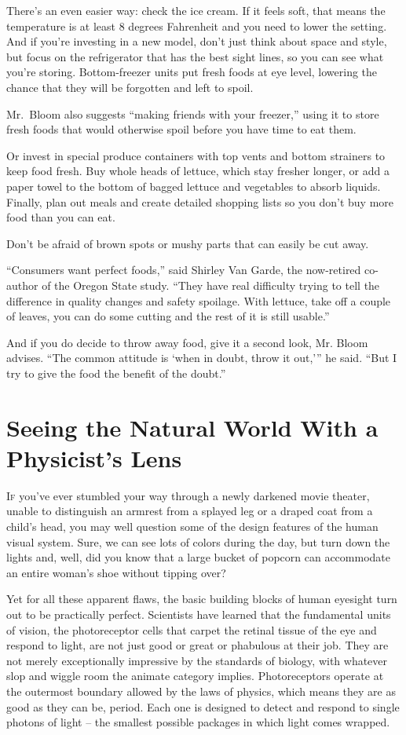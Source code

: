 ﻿\documentclass[12pt]{article}
\begin{document}
There's an even easier way: check the ice cream. If it feels soft, that means the temperature is at
least 8 degrees Fahrenheit and you need to lower the setting. And if you're investing in a new
model, don't just think about space and style, but focus on the refrigerator that has the best sight
lines, so you can see what you're storing. Bottom-freezer units put fresh foods at eye level,
lowering the chance that they will be forgotten and left to spoil.

Mr.~Bloom also suggests ``making friends with your freezer,'' using it to store fresh foods that
would otherwise spoil before you have time to eat them.

Or invest in special produce containers with top vents and bottom strainers to keep food fresh. Buy
whole heads of lettuce, which stay fresher longer, or add a paper towel to the bottom of bagged
lettuce and vegetables to absorb liquids. Finally, plan out meals and create detailed shopping lists
so you don't buy more food than you can eat.

Don't be afraid of brown spots or mushy parts that can easily be cut away.

``Consumers want perfect foods,'' said Shirley Van Garde, the now-retired co-author of the Oregon
State study. ``They have real difficulty trying to tell the difference in quality changes and safety
spoilage. With lettuce, take off a couple of leaves, you can do some cutting and the rest of it is
still usable.''

And if you do decide to throw away food, give it a second look, Mr. Bloom advises. ``The common
attitude is `when in doubt, throw it out,''' he said. ``But I try to give the food the benefit of
the doubt.''

\section{Seeing the Natural World With a Physicist's Lens}

\lettrine{I}{f} you've ever stumbled your way through a newly darkened movie
theater, unable to distinguish an armrest from a splayed leg or a draped coat from a child's head,
you may well question some of the design features of the human visual system. Sure, we can see lots
of colors during the day, but turn down the lights and, well, did you know that a large bucket of
popcorn can accommodate an entire woman's shoe without tipping over?

Yet for all these apparent flaws, the basic building blocks of human eyesight turn out to be
practically perfect. Scientists have learned that the fundamental units of vision, the photoreceptor
cells that carpet the retinal tissue of the eye and respond to light, are not just good or great or
phabulous at their job. They are not merely exceptionally impressive by the standards of biology,
with whatever slop and wiggle room the animate category implies. Photoreceptors operate at the
outermost boundary allowed by the laws of physics, which means they are as good as they can be,
period. Each one is designed to detect and respond to single photons of light -- the smallest
possible packages in which light comes wrapped.
\end{document}
